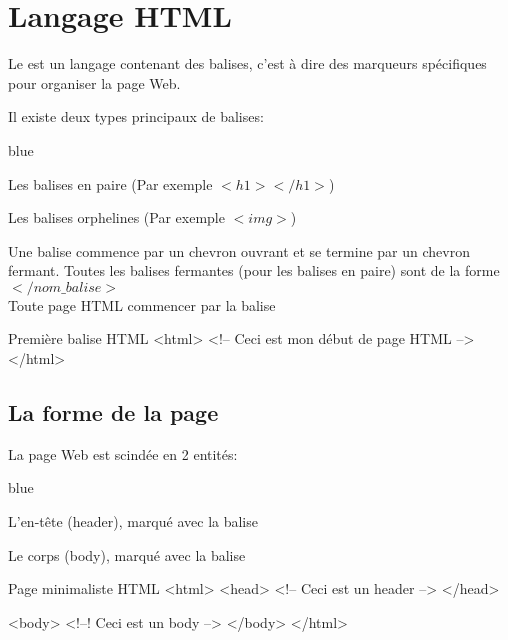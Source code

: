 \chapter{Langage HTML}

Le  est un langage contenant des balises, c'est à dire des 
marqueurs spécifiques pour organiser la page Web.

Il existe deux types principaux de balises: 

\begin{items}{blue}{\Triangle}
\item Les balises en paire (Par exemple $<h1></h1>$)
\item Les balises orphelines (Par exemple $<img>$)
\end{items}

Une balise commence par un chevron ouvrant et se termine par un chevron fermant.
Toutes les balises fermantes (pour les balises en paire) sont de la forme $</nom\_balise>$ \\

Toute page HTML commencer par la balise 



\begin{Html}{Première balise HTML}
<html>
    <!-- Ceci est mon début de page HTML --> 
</html>
\end{Html}

\section{La forme de la page}

La page Web est scindée en 2 entités: 

\begin{items}{blue}{\Triangle}
\item L'en-tête (header), marqué avec la balise 
\item Le corps (body), marqué avec la balise 
\end{items}

\begin{Html}{Page minimaliste HTML}
<html>
    <head>
        <!-- Ceci est un header --> 
    </head>

    <body>
        <!--! Ceci est un body -->
    </body>
</html>
\end{Html}


